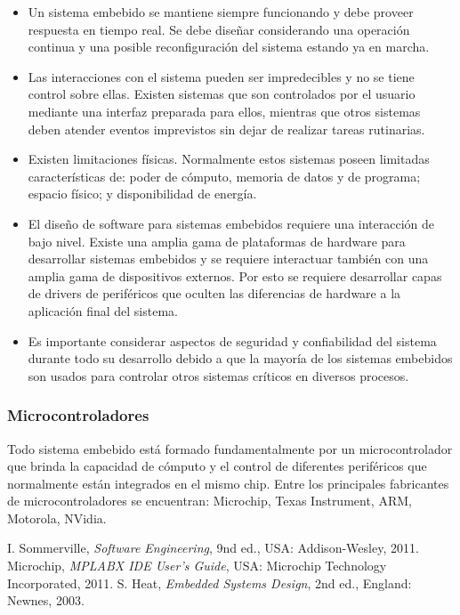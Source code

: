 \documentclass[11pt,letterpaper]{article}
\begin{document}
\begin{itemize}
	\item Un sistema embebido se mantiene siempre funcionando y debe proveer respuesta en tiempo real. Se debe diseñar considerando una operación continua y una posible reconfiguración del sistema estando ya en marcha.
	
	\item Las interacciones con el sistema pueden ser impredecibles y no se tiene control sobre ellas. Existen sistemas que son controlados por el usuario mediante una interfaz preparada para ellos, mientras que otros sistemas deben atender eventos imprevistos sin dejar de realizar tareas rutinarias.
	
	\item Existen limitaciones físicas. Normalmente estos sistemas poseen limitadas características de: poder de cómputo, memoria de datos y de programa; espacio físico; y disponibilidad de energía.
	
	\item El diseño de software para sistemas embebidos requiere una interacción de bajo nivel. Existe una amplia gama de plataformas de hardware para desarrollar sistemas embebidos y se requiere interactuar también con una amplia gama de dispositivos externos. Por esto se requiere desarrollar capas de drivers de periféricos que oculten las diferencias de hardware a la aplicación final del sistema.
	
	\item Es importante considerar aspectos de seguridad y confiabilidad del sistema durante todo su desarrollo debido a que la mayoría de los sistemas embebidos son usados para controlar otros sistemas críticos en diversos procesos.
\end{itemize}

\subsubsection{Microcontroladores}

Todo sistema embebido está formado fundamentalmente por un microcontrolador que brinda la capacidad de cómputo y el control de diferentes periféricos que normalmente están integrados en el mismo chip. Entre los principales fabricantes de microcontroladores se encuentran: Microchip, Texas Instrument, ARM, Motorola, NVidia.


\newpage
\begin{thebibliography}{5}
	 I. Sommerville, \textit{Software Engineering}, 9nd ed., USA: Addison-Wesley, 2011.
	 Microchip, \textit{MPLABX IDE User's Guide}, USA:  Microchip Technology Incorporated, 2011.
	 S. Heat, \textit{Embedded Systems Design}, 2nd ed., England: Newnes, 2003.
	
\end{thebibliography}
\end{document}
